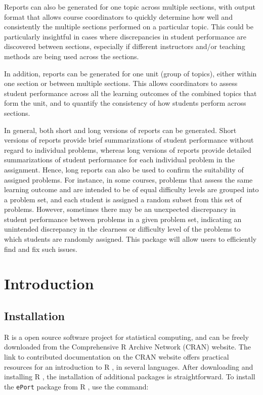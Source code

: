 \documentclass{article}\usepackage[]{graphicx}\usepackage[]{color}
\numberwithin{equation}{section} %
\newcommand{\pkg}[1]{{\texttt{#1}}}
\newcommand{\R}{{\normalfont\textsf{R }}{}}
\begin{document}
Reports can also be generated for one topic across multiple sections, with output format that allows course coordinators to quickly determine how well and consistently the multiple sections performed on a particular topic. This could be particularly insightful in cases where discrepancies in student performance are discovered between sections, especially if different instructors and/or teaching methods are being used across the sections.

In addition, reports can be generated for one unit (group of topics), either within one section or between multiple sections. This allows coordinators to assess student performance across all the learning outcomes of the combined topics that form the unit, and to quantify the consistency of how students perform across sections.

In general, both short and long versions of reports can be generated. Short versions of reports provide brief summarizations of student performance without regard to individual problems, whereas long versions of reports provide detailed summarizations of student performance for each individual problem in the assignment. Hence, long reports can also be used to confirm the suitability of assigned problems. For instance, in some courses, problems that assess the same learning outcome and are intended to be of equal difficulty levels are grouped into a problem set, and each student is assigned a random subset from this set of problems. However, sometimes there may be an unexpected discrepancy in student performance between problems in a given problem set, indicating an unintended discrepancy in the clearness or difficulty level of the problems to which students are randomly assigned. This package will allow users to efficiently find and fix such issues. 

\bigskip

\section{Introduction}

\subsection{Installation}

\R is a open source software project for statistical computing, and can be freely downloaded from the Comprehensive R Archive Network (CRAN) website. The link to contributed documentation on the CRAN website offers practical resources for an introduction to \R, in several languages. After downloading and installing \R, the installation of additional packages is straightforward. To install the \pkg{ePort} package from \R, use the command:
\end{document}

